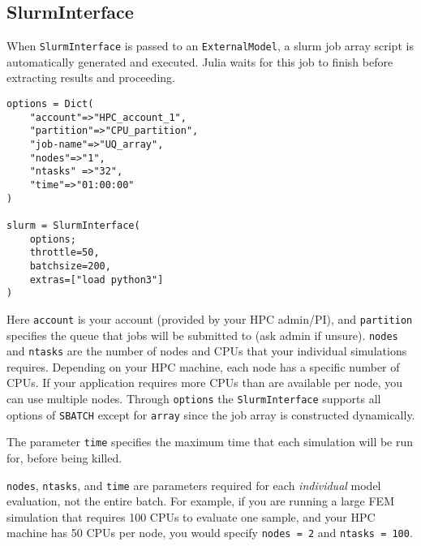 \subsection{SlurmInterface}



\label{260344389708059720}{}


When \texttt{SlurmInterface} is passed to an \texttt{ExternalModel}, a slurm job array script is automatically generated and executed. Julia waits for this job to finish before extracting results and proceeding.




\begin{verbatim}
options = Dict(
    "account"=>"HPC_account_1",
    "partition"=>"CPU_partition",
    "job-name"=>"UQ_array",
    "nodes"=>"1",
    "ntasks" =>"32",
    "time"=>"01:00:00"
)

slurm = SlurmInterface(
    options;
    throttle=50,
    batchsize=200,
    extras=["load python3"]
)
\end{verbatim}



Here \texttt{account} is your account (provided by your HPC admin/PI), and \texttt{partition} specifies the queue that jobs will be submitted to (ask admin if unsure). \texttt{nodes} and \texttt{ntasks} are the number of nodes and CPUs that your individual simulations requires. Depending on your HPC machine, each node has a specific number of CPUs. If your application requires more CPUs than are available per node, you can use multiple nodes. Through \texttt{options} the \texttt{SlurmInterface} supports all options of \texttt{SBATCH} except for \texttt{array} since the job array is constructed dynamically.



The parameter \texttt{time} specifies the maximum time that each simulation will be run for, before being killed.



\begin{tcolorbox}[toptitle=-1mm,bottomtitle=1mm,colback=admonition-warning!50!white,colframe=admonition-warning,title=\textbf{Individual model runs VS overall batch}]
\texttt{nodes}, \texttt{ntasks}, and \texttt{time} are parameters required for each \emph{individual} model evaluation, not the entire batch. For example, if you are running a large FEM simulation that requires 100 CPUs to evaluate one sample, and your HPC machine has 50 CPUs per node, you would specify \texttt{nodes = 2} and \texttt{ntasks = 100}.

\end{tcolorbox}


